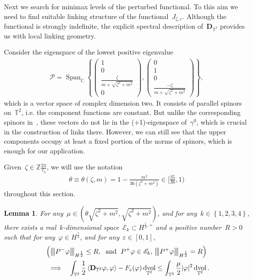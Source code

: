 \documentclass[10pt,a4paper]{amsart}
\newcommand{\tnorm}[1]{%
  \left\vert\kern-0.3ex\left\vert\kern-0.3ex\left\vert #1 \right\vert\kern-0.3ex\right\vert\kern-0.3ex\right\vert
}
\newcommand{\C}{\mathbb{C}}
\newcommand{\T}{\mathbb{T}}
\newcommand{\dd}{\mathop{}\!\mathrm{d}}
\newcommand{\eps}{\varepsilon}
\newcommand{\pD}{\mathbf{D}}
\newcommand{\Abracket}[1]{\left<#1\right>} %
\newcommand{\parenthesis}[1]{\left(#1\right)} %
\newcommand{\braces}[1]{\left\{#1\right\}} %
\newcommand{\bZ}{\mathbb{Z}}
\DeclareMathOperator{\dv}{\dd{vol}}
\DeclareMathOperator{\Span}{Span}
\newtheorem{lemma}[thm]{Lemma}
\begin{document}
Next we search for minimax levels of the perturbed functional.
To this aim we need to find suitable linking structure of the functional~$J_{\zeta,\eps}$.
Although the functional is strongly indefinite, the explicit spectral description of~$\pD_{\T^2}$ provides us with local linking geometry. 


Consider the eigenspace of the lowest positive eigenvalue
\begin{align}
        \mathscr{P}= \Span_{\C}\braces{ \begin{pmatrix} 1 \\ 0 \\\frac{\zeta}{ m+\sqrt{\zeta^2+m^2} } \\ 0  \end{pmatrix},
        \begin{pmatrix} 0 \\ 1 \\ 0 \\ \frac{-\zeta}{m+\sqrt{\zeta^2+m^2}} \end{pmatrix} },
\end{align}
which is a vector space of complex dimension two.
It consists of parallel spinors on~$\T^2$, i.e. the component functions are constant.
But unlike the corresponding spinors in~\cite{WZ2026Stationary}, these vectors do not lie in the (+1)-eigenspace of~$\gamma^0$, which is crucial in the construction of links there.
However, we can still see that the upper components occupy at least a fixed portion of the norms of spinors, which is enough for our application.

Given~$\zeta\in\bZ\frac{2\pi}{\ell_3}$, we will use the notation
\begin{align}
    \theta\equiv \theta(\zeta,m)=1-\frac{m^2}{36(\zeta^2+m^2)}\in [\frac{35}{36},1)
\end{align}
throughout this section. 

\begin{lemma}\label{lemma:local control}
    For any~$\mu \in  (\theta\sqrt{\zeta^2+m^2},\sqrt{\zeta^2+m^2})$, and for any~$k\in\braces{1,2,3,4}$, there exists a real~$k$-dimensional space~$\mathscr{E}_{k}\subset H^{\frac{1}{2},+}$ and a positive number~$R>0$ such that for any~$\varphi\in H^{\frac{1}{2}}$, and for any~$\eps\in [0,1]$,
    \begin{multline}
        \parenthesis{ \tnorm{P^-\varphi}_{H^{\frac{1}{2}}} \leq R, \; \mbox{ and }\;  P^+\varphi\in\mathscr{E}_{k}, \, \tnorm{P^+\varphi }_{H^{\frac{1}{2}}}=R }  \\
        \quad \Longrightarrow  \quad
        \int_{\T^2} \frac{1}{2}\Abracket{\pD_{\T^2}\varphi,\varphi}-F_\eps(\varphi) \dv_{\T^2} \leq \int_{\T^2} \frac{\mu}{2}|\varphi|^2 \dv_{\T^2}.
    \end{multline}
\end{lemma}
\end{document}
